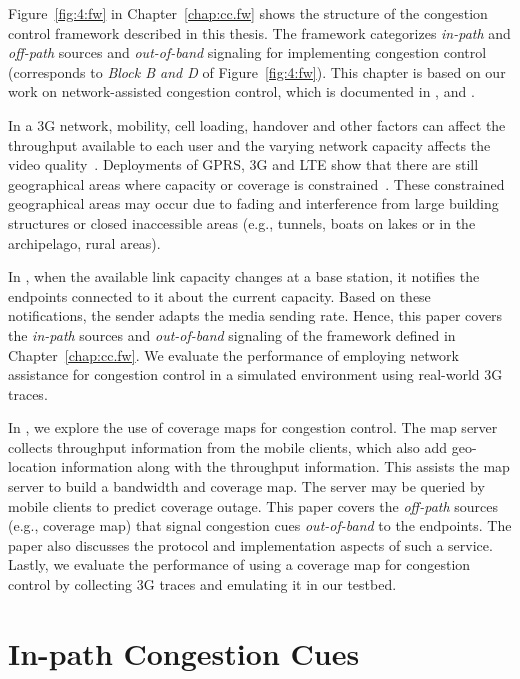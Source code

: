 Figure~\ref{fig:4:fw} in Chapter~\ref{chap:cc.fw} shows the structure of the
congestion control framework described in this thesis. The framework
categorizes \emph{in-path} and \emph{off-path} sources and \emph{out-of-band}
signaling for implementing congestion control (corresponds to
\emph{Block B and D} of Figure~\ref{fig:4:fw}). This chapter is based on our
work on network-assisted congestion control, which is documented in
,  and \cite{glass:patent}.

In a 3G network, mobility, cell loading, handover and other factors can
affect the throughput available to each user and the varying network capacity
affects the video quality~\cite{diaz2007evaluating}. Deployments of GPRS, 3G
and LTE show that there are still geographical areas where capacity or
coverage is constrained~\cite{Curcio:glass, 6576402}. These constrained
geographical areas may occur due to fading and interference from large
building structures or closed inaccessible areas (e.g., tunnels, boats on
lakes or in the archipelago, rural areas).

In , when the available link capacity changes at a base
station, it notifies the endpoints connected to it about the current capacity.
Based on these notifications, the sender adapts the media sending rate. Hence,
this paper covers the \emph{in-path} sources and \emph{out-of-band} signaling
of the framework defined in Chapter~\ref{chap:cc.fw}. We evaluate the
performance of employing network assistance for congestion control in a
simulated environment using real-world 3G traces.

In , we explore the use of coverage maps for congestion
control. The map server collects throughput information from the mobile
clients, which also add geo-location information along with the throughput
information. This assists the map server to build a bandwidth and coverage
map. The server may be queried by mobile clients to predict coverage outage.
This paper covers the \emph{off-path} sources (e.g., coverage map) that
signal congestion cues \emph{out-of-band} to the endpoints. The paper also
discusses the protocol and implementation aspects of such a service. Lastly,
we evaluate the performance of using a coverage map for congestion control by
collecting 3G traces and emulating it in our testbed.

\section{In-path Congestion Cues}

